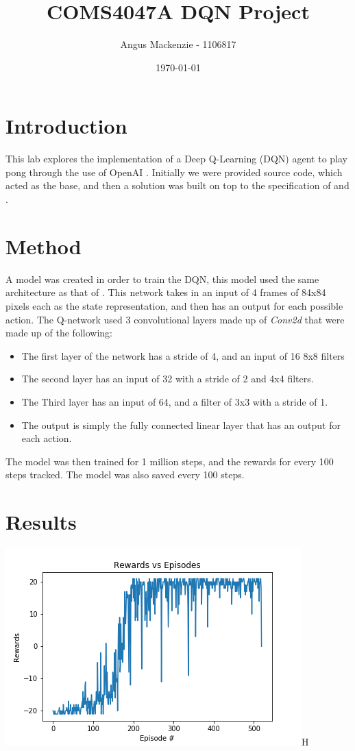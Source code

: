 \documentclass[10pt]{article}
\begin{document}
\title{COMS4047A DQN Project}
\author{Angus Mackenzie - 1106817}
\date{\today} 
\maketitle 
\pagestyle{fancy}
\fancyhf{}
\fancyhead[R]{\thepage}
{}
\section{Introduction}
This lab explores the implementation of a Deep Q-Learning (DQN) agent to play pong through the use of OpenAI \cite{openai}. Initially we were provided source code, which acted as the base, and then a solution was built on top to the specification of \cite{Deepmind} and \cite{NaturePaper}.

\section{Method}
A model was created in order to train the DQN, this model used the same architecture as that of \cite{NaturePaper}. This network takes in an input of 4 frames of 84x84 pixels each as the state representation, and then has an output for each possible action. The Q-network used 3 convolutional layers made up of \emph{Conv2d} that were made up of the following:
\begin{itemize}
    \item The first layer of the network has a stride of 4, and an input of 16 8x8 filters
    \item The second layer has an input of 32 with a stride of 2 and 4x4 filters.
    \item The Third layer has an input of 64, and a filter of 3x3 with a stride of 1.
    \item The output is simply the fully connected linear layer that has an output for each action. 
\end{itemize}   

The model was then trained for 1 million steps, and the rewards for every 100 steps tracked. The model was also saved every 100 steps. 

\section{Results}

\includegraphics{../submission/plot.png}H
\end{document}
